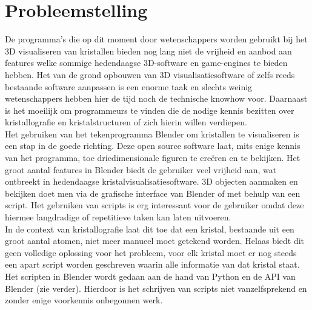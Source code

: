 \section{Probleemstelling}
De programma’s die op dit moment door wetenschappers worden gebruikt bij het 3D visualiseren van kristallen bieden nog lang niet de vrijheid en aanbod aan features welke sommige hedendaagse 3D-software en game-engines te bieden hebben. Het van de grond opbouwen van 3D visualisatiesoftware of zelfs reeds bestaande software aanpassen is een enorme taak en slechts weinig wetenschappers hebben hier de tijd noch de technische knowhow voor. Daarnaast is het moeilijk om programmeurs te vinden die de nodige kennis bezitten over kristallografie en kristalstructuren of zich hierin willen verdiepen.  
\\
Het gebruiken van het tekenprogramma Blender om kristallen te visualiseren is een stap in de goede richting. Deze open source software laat, mits enige kennis van het programma, toe driedimensionale figuren te creëren en te bekijken. Het groot aantal features in Blender biedt de gebruiker veel vrijheid aan, wat ontbreekt in hedendaagse kristalvisualisatiesoftware. 3D objecten aanmaken en bekijken doet men via de grafische interface van Blender of met behulp van een script. Het gebruiken van scripts is erg interessant voor de gebruiker omdat deze hiermee langdradige of repetitieve taken kan laten uitvoeren. 
\\
In de context van kristallografie laat dit toe dat een kristal, bestaande uit een groot aantal atomen, niet meer manueel moet getekend worden. Helaas biedt dit geen volledige oplossing voor het probleem, voor elk kristal moet er nog steeds een apart script worden geschreven waarin alle informatie van dat kristal staat. Het scripten in Blender wordt gedaan aan de hand van Python en de API van Blender (zie verder). Hierdoor is het schrijven van scripts niet vanzelfsprekend en zonder enige voorkennis onbegonnen werk.

